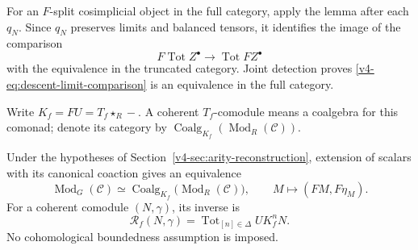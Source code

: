 For an \(F\)-split cosimplicial object in the full category,
apply the lemma after each \(q_N\).
Since \(q_N\) preserves limits and balanced tensors, it
identifies the image of the comparison
\begin{equation}\label{v4-eq:descent-limit-comparison}
 F\operatorname{Tot}Z^\bullet
 \longrightarrow \operatorname{Tot}FZ^\bullet
\end{equation}
with the equivalence in the truncated category.
Joint detection proves \eqref{v4-eq:descent-limit-comparison}
is an equivalence in the full category.

Write \(K_f=FU=T_f\star_R-\). A coherent \(T_f\)-comodule means
a coalgebra for this comonad; denote its category by
\(\operatorname{Coalg}_{K_f}(\operatorname{Mod}_R(\mathcal C))\).

\begin{theorem}
\label{v4-thm:effective-descent}
Under the hypotheses of Section~\ref{v4-sec:arity-reconstruction},
extension of scalars with its canonical coaction gives an equivalence
\[
 \operatorname{Mod}_G(\mathcal C)
 \simeq
 \operatorname{Coalg}_{K_f}
       \bigl(\operatorname{Mod}_R(\mathcal C)\bigr),
 \qquad
 M\longmapsto(FM,F\eta_M).
\]
For a coherent comodule \((N,\gamma)\), its inverse is
\begin{equation}\label{v4-eq:descent-inverse}
 \mathcal R_f(N,\gamma)
 =
 \operatorname{Tot}_{[n]\in\Delta}UK_f^nN.
\end{equation}
No cohomological boundedness assumption is imposed.
\end{theorem}

